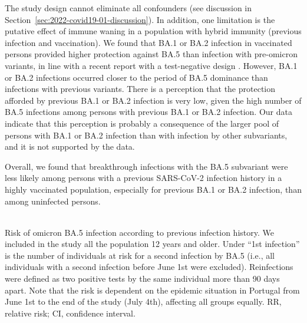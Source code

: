 The study design cannot eliminate all confounders (see discussion in Section~\ref{sec:2022-covid19-01-discussion}). In addition, one limitation is the putative effect of immune waning in a population with hybrid immunity (previous infection and vaccination). We found that BA.1 or BA.2 infection in vaccinated persons provided higher protection against BA.5 than infection with pre-omicron variants, in line with a recent report with a test-negative design \citep{altarawneh2022ProtectionSARSCoV2}. However, BA.1 or BA.2 infections occurred closer to the period of BA.5 dominance than infections with previous variants. There is a perception that the protection afforded by previous BA.1 or BA.2 infection is very low, given the high number of BA.5 infections among persons with previous BA.1 or BA.2 infection. Our data indicate that this perception is probably a consequence of the larger pool of persons with BA.1 or BA.2 infection than with infection by other subvariants, and it is not supported by the data.

Overall, we found that breakthrough infections with the BA.5 subvariant were less likely among persons with a previous SARS-CoV-2 infection history in a highly vaccinated population, especially for previous BA.1 or BA.2 infection, than among uninfected persons.
\\
\\
\begin{table}[h]
    \centering
    \caption[Risk of omicron BA.5 infection according to previous infection history]{Risk of omicron BA.5 infection according to previous infection history. We included in the study all the population 12 years and older. Under ``1st infection'' is the number of individuals at risk for a second infection by BA.5 (i.e., all individuals with a second infection before June 1st were excluded). Reinfections were defined as two positive tests by the same individual more than 90 days apart. Note that the risk is dependent on the epidemic situation in Portugal from June 1st to the end of the study (July 4th), affecting all groups equally. RR, relative risk; CI, confidence interval.}
    \resizebox{\textwidth}{!}{}
    \label{tab:tabs1-risk-infection-ba5}
\end{table}

\clearpage
